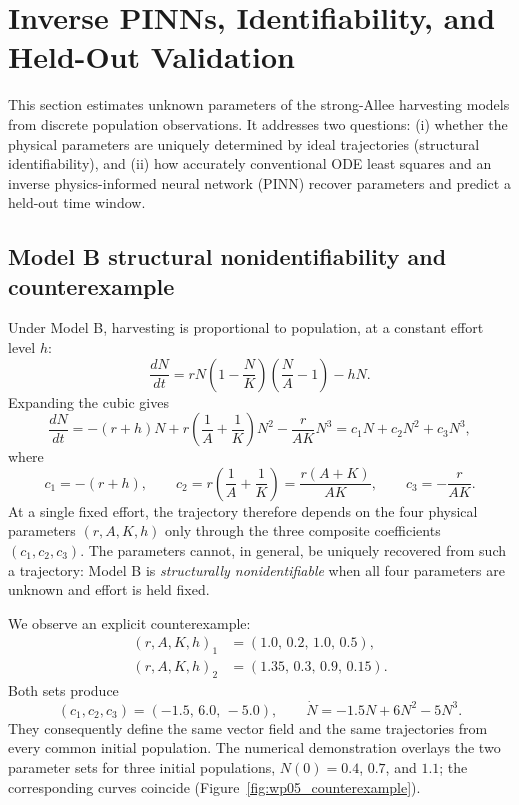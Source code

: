 \section{Inverse PINNs, Identifiability, and Held-Out Validation}
\label{sec:wp05}

This section estimates unknown parameters of the strong-Allee harvesting models from
discrete population observations. It addresses two questions:
(i) whether the physical parameters are uniquely determined by ideal trajectories
(structural identifiability), and (ii) how accurately conventional ODE least squares
and an inverse physics-informed neural network (PINN) recover parameters and predict
a held-out time window.

\subsection{Model B structural nonidentifiability and counterexample}
\label{sec:identifiability}

Under Model B, harvesting is proportional to population, at a constant effort
level $h$:
\begin{equation}
\frac{dN}{dt}
=
rN\left(1-\frac{N}{K}\right)\left(\frac{N}{A}-1\right)-hN.
\label{eq:modelB_inverse}
\end{equation}
Expanding the cubic gives
\begin{equation}
\frac{dN}{dt}
=
-(r+h)N
+r\left(\frac{1}{A}+\frac{1}{K}\right)N^2
-\frac{r}{AK}N^3
=
c_1N+c_2N^2+c_3N^3,
\label{eq:model_b_coefficients}
\end{equation}
where
\begin{equation}
c_1=-(r+h),\qquad
c_2=r\left(\frac{1}{A}+\frac{1}{K}\right)
=\frac{r(A+K)}{AK},\qquad
c_3=-\frac{r}{AK}.
\end{equation}
At a single fixed effort, the trajectory therefore depends on the four physical
parameters $(r,A,K,h)$ only through the three composite coefficients
$(c_1,c_2,c_3)$. The parameters cannot, in general, be uniquely recovered from
such a trajectory: Model B is \emph{structurally nonidentifiable} when all four
parameters are unknown and effort is held fixed.

We observe an explicit counterexample:
\begin{align}
(r,A,K,h)_1&=(1.0,\,0.2,\,1.0,\,0.5),\\
(r,A,K,h)_2&=(1.35,\,0.3,\,0.9,\,0.15).
\end{align}
Both sets produce
\begin{equation}
(c_1,c_2,c_3)=(-1.5,\,6.0,\,-5.0),
\qquad
\dot N=-1.5N+6N^2-5N^3.
\end{equation}
They consequently define the same vector field and the same trajectories from
every common initial population. The numerical demonstration overlays the two
parameter sets for three initial populations, $N(0)=0.4$, $0.7$, and $1.1$;
the corresponding curves coincide (Figure~\ref{fig:wp05_counterexample}).


